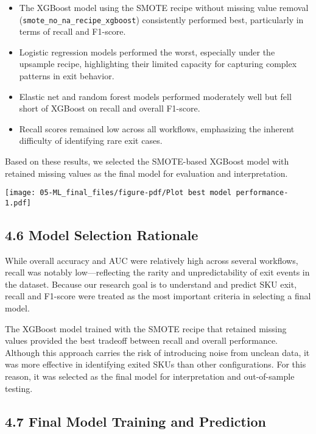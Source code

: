 \documentclass[
  letterpaper,
  DIV=11,
  numbers=noendperiod]{scrartcl}
\providecommand{\tightlist}{%
  \setlength{\itemsep}{0pt}\setlength{\parskip}{0pt}}\usepackage{longtable,booktabs,array}
\begin{document}
\begin{itemize}
\tightlist
\item
  The XGBoost model using the SMOTE recipe without missing value removal
  (\texttt{smote\_no\_na\_recipe\_xgboost}) consistently performed best,
  particularly in terms of recall and F1-score.
\item
  Logistic regression models performed the worst, especially under the
  upsample recipe, highlighting their limited capacity for capturing
  complex patterns in exit behavior.
\item
  Elastic net and random forest models performed moderately well but
  fell short of XGBoost on recall and overall F1-score.
\item
  Recall scores remained low across all workflows, emphasizing the
  inherent difficulty of identifying rare exit cases.
\end{itemize}

Based on these results, we selected the SMOTE-based XGBoost model with
retained missing values as the final model for evaluation and
interpretation.

\texttt{[image: 05-ML\_final\_files/figure-pdf/Plot best model performance-1.pdf]}

\subsection{4.6 Model Selection
Rationale}\label{model-selection-rationale}

While overall accuracy and AUC were relatively high across several
workflows, recall was notably low---reflecting the rarity and
unpredictability of exit events in the dataset. Because our research
goal is to understand and predict SKU exit, recall and F1-score were
treated as the most important criteria in selecting a final model.

The XGBoost model trained with the SMOTE recipe that retained missing
values provided the best tradeoff between recall and overall
performance. Although this approach carries the risk of introducing
noise from unclean data, it was more effective in identifying exited
SKUs than other configurations. For this reason, it was selected as the
final model for interpretation and out-of-sample testing.

\subsection{4.7 Final Model Training and
Prediction}\label{final-model-training-and-prediction}
\end{document}
